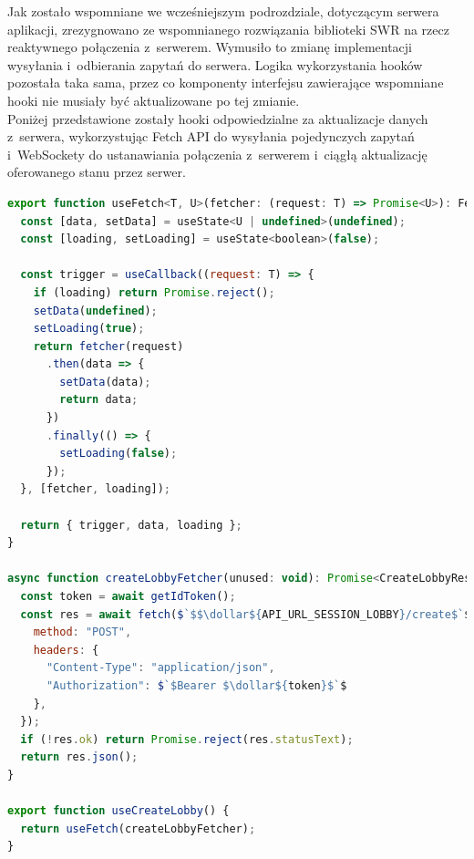 Jak zostało wspomniane we wcześniejszym podrozdziale, dotyczącym serwera aplikacji,
zrezygnowano ze wspomnianego rozwiązania biblioteki SWR na rzecz reaktywnego
połączenia z~serwerem. Wymusiło to zmianę implementacji wysyłania i~odbierania
zapytań do serwera. Logika
wykorzystania hooków pozostała taka sama, przez co komponenty interfejsu
zawierające wspomniane hooki nie musiały być aktualizowane po tej zmianie. \\

Poniżej przedstawione zostały hooki odpowiedzialne za aktualizacje
danych z~serwera, wykorzystując Fetch API \cite{FetchAPI} do wysyłania pojedynczych
zapytań i~WebSockety \cite{WebSockets} do ustanawiania połączenia z~serwerem
i~ciągłą aktualizację oferowanego stanu przez serwer.

\begin{lstlisting}[language=JavaScript, caption=Hooki z Fetch API, label={lst:fetch-hooks}, captionpos=b]
export function useFetch<T, U>(fetcher: (request: T) => Promise<U>): FetchState<T, U> {
  const [data, setData] = useState<U | undefined>(undefined);
  const [loading, setLoading] = useState<boolean>(false);

  const trigger = useCallback((request: T) => {
    if (loading) return Promise.reject();
    setData(undefined);
    setLoading(true);
    return fetcher(request)
      .then(data => {
        setData(data);
        return data;
      })
      .finally(() => {
        setLoading(false);
      });
  }, [fetcher, loading]);

  return { trigger, data, loading };
}

async function createLobbyFetcher(unused: void): Promise<CreateLobbyResponse> {
  const token = await getIdToken();
  const res = await fetch($`$$\dollar${API_URL_SESSION_LOBBY}/create$`$, {
    method: "POST",
    headers: {
      "Content-Type": "application/json",
      "Authorization": $`$Bearer $\dollar${token}$`$
    },
  });
  if (!res.ok) return Promise.reject(res.statusText);
  return res.json();
}

export function useCreateLobby() {
  return useFetch(createLobbyFetcher);
}
\end{lstlisting}

\vspace*{0.5cm}

